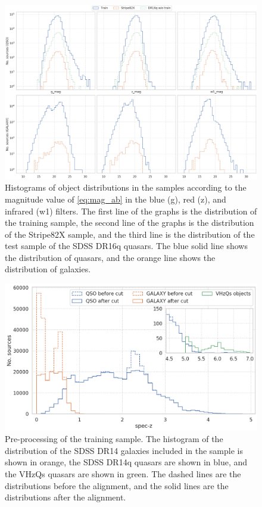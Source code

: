 \documentclass[fleqn,usenatbib]{mnras}
\begin{document}
\begin{figure}
    \centering
    \includegraphics[width=0.9\linewidth]{images/data-dist-mags-ab_final.png}
    \caption{Histograms of object distributions in the samples according to the magnitude value of \eqref{eq:mag_ab} in the blue (g), red (z), and infrared (w1) filters. The first line of the graphs is the distribution of the training sample, the second line of the graphs is the distribution of the Stripe82X sample, and the third line is the distribution of the test sample of the SDSS DR16q quasars. The blue solid line shows the distribution of quasars, and the orange line shows the distribution of galaxies.}
    \label{fig:data-dist-mags-ab}
\end{figure}

\begin{figure}
    \centering
    \includegraphics[width=0.95\linewidth]{images/train-peaks-cut.png}
    \caption{Pre-processing of the training sample. The histogram of the distribution of the SDSS DR14 galaxies included in the sample is shown in orange, the SDSS DR14q quasars are shown in blue, and the VHzQs quasars are shown in green. The dashed lines are the distributions before the alignment, and the solid lines are the distributions after the alignment.}
    \label{fig:train-peaks-cut}
\end{figure}
\end{document}
